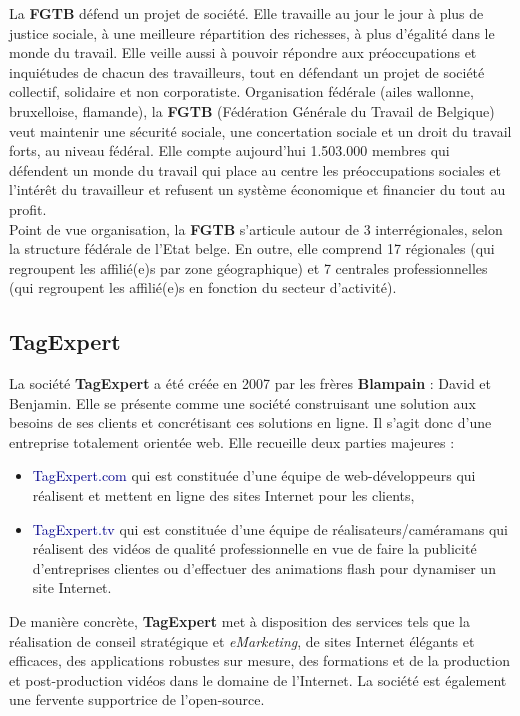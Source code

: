\documentclass{article}
\newcommand{\blu}[1]{\textcolor{darkblue}{#1}}
\begin{document}
\begin{sffamily}
La \textbf{FGTB} défend un projet de société. Elle travaille au jour le jour à plus de justice sociale, à une meilleure répartition des richesses, 
à plus d’égalité dans le monde du travail. Elle veille aussi à pouvoir répondre aux préoccupations et inquiétudes de chacun des travailleurs, tout 
en défendant un projet de société collectif, solidaire et non corporatiste. Organisation fédérale (ailes wallonne, bruxelloise, flamande), la 
\textbf{FGTB} (Fédération Générale du Travail de Belgique) veut maintenir une sécurité sociale, une concertation sociale et un droit du travail 
forts, au niveau fédéral. Elle compte aujourd'hui 1.503.000 membres qui défendent un monde du travail qui place au centre les préoccupations 
sociales et l’intérêt du travailleur et refusent un système économique et financier du tout au profit. \\

Point de vue organisation, la \textbf{FGTB} s’articule autour de 3 interrégionales, selon la structure fédérale de l'Etat belge. En outre, elle 
comprend 17 régionales (qui regroupent les affilié(e)s par zone géographique) et 7 centrales professionnelles (qui regroupent les affilié(e)s en 
fonction du secteur d’activité).

\subsection{TagExpert}

La société \textbf{TagExpert} a été créée en 2007 par les frères \textbf{Blampain} : David et Benjamin. Elle se présente comme une société 
construisant une solution aux besoins de ses clients et concrétisant ces solutions en ligne. Il s'agit donc d'une entreprise totalement orientée 
web. Elle recueille deux parties majeures : 
\begin{itemize}
\item \blu{TagExpert.com} qui est constituée d'une équipe de web-développeurs qui réalisent et mettent en ligne des sites Internet pour les 
clients,
\item \blu{TagExpert.tv} qui est constituée d'une équipe de réalisateurs/caméramans qui réalisent des vidéos de qualité professionnelle en vue de 
faire la publicité 
d'entreprises clientes ou d'effectuer des animations flash pour dynamiser un site Internet.
\end{itemize}

De manière concrète, \textbf{TagExpert} met à disposition des services tels que la réalisation de conseil stratégique et \textit{eMarketing}, de 
sites Internet élégants et efficaces, des applications robustes sur mesure, des formations et de la production et post-production vidéos dans le 
domaine de l'Internet. La société est également une fervente supportrice de l'open-source.


\end{sffamily}
\end{document}
